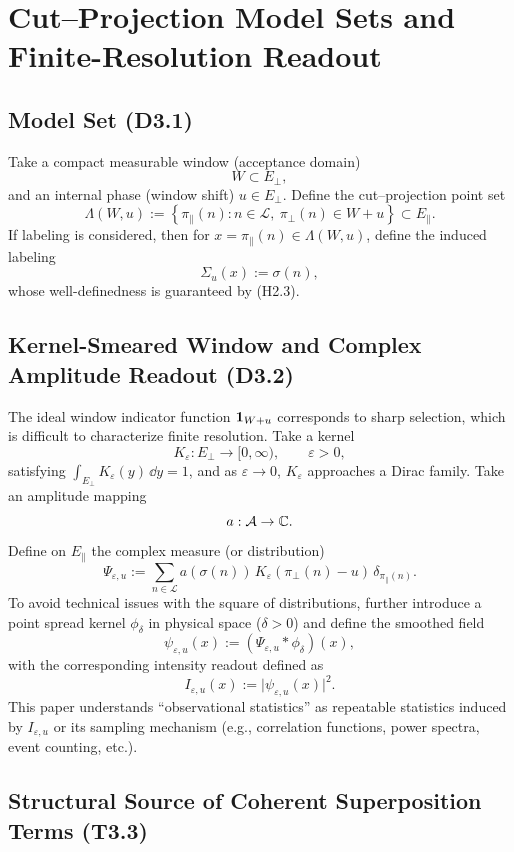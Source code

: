 \section{Cut--Projection Model Sets and Finite-Resolution Readout}\label{sec:cut-project-readout}

\subsection{Model Set (D3.1)}

Take a compact measurable window (acceptance domain)
\[
W\subset E_{\perp},
\]
and an internal phase (window shift) $u\in E_{\perp}$. Define the cut--projection point set
\[
\Lambda(W,u):=\left\{\pi_{\parallel}(n):n\in\mathcal{L},\ \pi_{\perp}(n)\in W+u\right\}\subset E_{\parallel}.
\]
If labeling is considered, then for $x=\pi_{\parallel}(n)\in\Lambda(W,u)$, define the induced labeling
\[
\Sigma_{u}(x):=\sigma(n),
\]
whose well-definedness is guaranteed by (H2.3).

\subsection{Kernel-Smeared Window and Complex Amplitude Readout (D3.2)}

The ideal window indicator function $\mathbf{1}_{W+u}$ corresponds to sharp selection, which is difficult to characterize finite resolution. Take a kernel
\[
K_{\varepsilon}:E_{\perp}\to[0,\infty),\qquad \varepsilon>0,
\]
satisfying $\int_{E_{\perp}}K_{\varepsilon}(y)\,\dd y=1$, and as $\varepsilon\to 0$, $K_{\varepsilon}$ approaches a Dirac family. Take an amplitude mapping
\[
a:\mathcal{A}\to\mathbb{C}.
\]
Define on $E_{\parallel}$ the complex measure (or distribution)
\[
\Psi_{\varepsilon,u}:=\sum_{n\in\mathcal{L}} a(\sigma(n))\,K_{\varepsilon}(\pi_{\perp}(n)-u)\,\delta_{\pi_{\parallel}(n)} .
\]
To avoid technical issues with the square of distributions, further introduce a point spread kernel $\phi_{\delta}$ in physical space ($\delta>0$) and define the smoothed field
\[
\psi_{\varepsilon,u}(x):=(\Psi_{\varepsilon,u}*\phi_{\delta})(x),
\]
with the corresponding intensity readout defined as
\[
I_{\varepsilon,u}(x):=\big|\psi_{\varepsilon,u}(x)\big|^{2}.
\]
This paper understands ``observational statistics'' as repeatable statistics induced by $I_{\varepsilon,u}$ or its sampling mechanism (e.g., correlation functions, power spectra, event counting, etc.).

\subsection{Structural Source of Coherent Superposition Terms (T3.3)}

